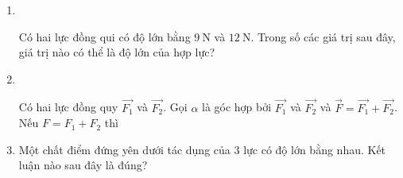 \begin{enumerate}[label=\bfseries Câu \arabic*:]
{		Tổng hợp lực là thay thế các lực tác dụng đồng thời vào cùng một vật bằng một lực có tác dụng giống hệt như các lực ấy.
	}

	\item {}\\
	{Có hai lực đồng qui có độ lớn bằng $\SI{9}{\newton}$ và $\SI{12}{\newton}$. Trong số các giá trị sau đây, giá trị nào có thể là độ lớn của hợp lực?
	
}

\item {}\\
{Có hai lực đồng quy $\overrightarrow{F_1}$ và $\overrightarrow{F_2}$. Gọi $\alpha$ là góc hợp bởi $\overrightarrow{F_1}$ và $\overrightarrow{F_2}$ và $\overrightarrow{F} =\overrightarrow{F_1}+\overrightarrow{F_2}$. Nếu $F=F_1+F_2$ thì
	\begin{mcq}(4)
		\item $\alpha=\SI{0}{\degree}$.
		\item $\alpha=\SI{180}{\degree}$.
		\item $\alpha=\SI{90}{\degree}$.
		\item $\SI{0}{\degree}<\alpha<\SI{90}{\degree}$.
	\end{mcq}

}

	\item {}
	
	{ Một chất điểm đứng yên dưới tác dụng của $3$ lực có độ lớn bằng nhau. Kết luận nào sau đây là đúng?
	}
\end{enumerate}
